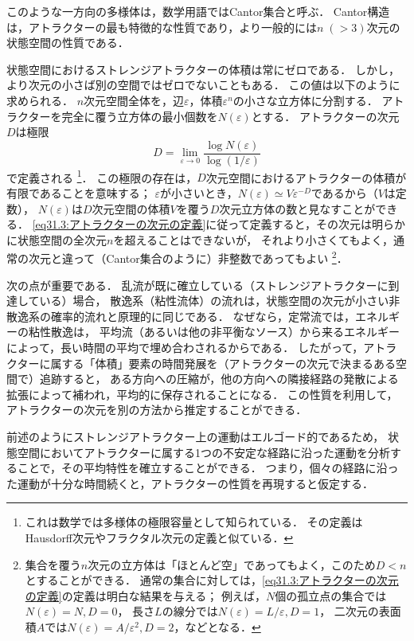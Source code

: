 このような一方向の多様体は，数学用語ではCantor集合と呼ぶ．
Cantor構造は，アトラクターの最も特徴的な性質であり，より一般的には$n\;(>3)$次元の状態空間の性質である．




状態空間におけるストレンジアトラクターの体積は常にゼロである．
しかし，より次元の小さば別の空間ではゼロでないこともある．
この値は以下のように求められる．
$n$次元空間全体を，辺$\varepsilon$，体積$\varepsilon^n$の小さな立方体に分割する．
アトラクターを完全に覆う立方体の最小個数を$N(\varepsilon)$とする．
アトラクターの次元$D$は極限
\begin{equation}\label{eq31.3:アトラクターの次元の定義}
    D = \lim_{\varepsilon\to0} \frac{\log N(\varepsilon)}{\log(1/\varepsilon)}
\end{equation}
で定義される
\footnote{これは数学では多様体の極限容量として知られている．
その定義はHausdorff次元やフラクタル次元の定義と似ている．}．
この極限の存在は，$D$次元空間におけるアトラクターの体積が有限であることを意味する；
$\varepsilon$が小さいとき，$N(\varepsilon)\simeq V \varepsilon^{-D}$であるから（$V$は定数），
$N(\varepsilon)$は$D$次元空間の体積$V$を覆う$D$次元立方体の数と見なすことができる．
\eqref{eq31.3:アトラクターの次元の定義}に従って定義すると，その次元は明らかに状態空間の全次元$n$を超えることはできないが，
それより小さくてもよく，通常の次元と違って（Cantor集合のように）非整数であってもよい
\footnote{
集合を覆う$n$次元の立方体は「ほとんど空」であってもよく，このため$D<n$とすることができる．
通常の集合に対しては，\eqref{eq31.3:アトラクターの次元の定義}の定義は明白な結果を与える；
例えば，$N$個の孤立点の集合では$N(\varepsilon)=N, D=0$，
長さ$L$の線分では$N(\varepsilon)=L/\varepsilon, D=1$，
二次元の表面積$A$では$N(\varepsilon)=A/\varepsilon^2, D=2$，などとなる．}．



次の点が重要である．
乱流が既に確立している（ストレンジアトラクターに到達している）場合，
散逸系（粘性流体）の流れは，状態空間の次元が小さい非散逸系の確率的流れと原理的に同じである．
なぜなら，定常流では，エネルギーの粘性散逸は，
平均流（あるいは他の非平衡なソース）から来るエネルギーによって，長い時間の平均で埋め合わされるからである．
したがって，アトラクターに属する「体積」要素の時間発展を（アトラクターの次元で決まるある空間で）追跡すると，
ある方向への圧縮が，他の方向への隣接経路の発散による拡張によって補われ，平均的に保存されることになる．
この性質を利用して，アトラクターの次元を別の方法から推定することができる．


前述のようにストレンジアトラクター上の運動はエルゴード的であるため，
状態空間においてアトラクターに属する1つの不安定な経路に沿った運動を分析することで，その平均特性を確立することができる．
つまり，個々の経路に沿った運動が十分な時間続くと，アトラクターの性質を再現すると仮定する．

